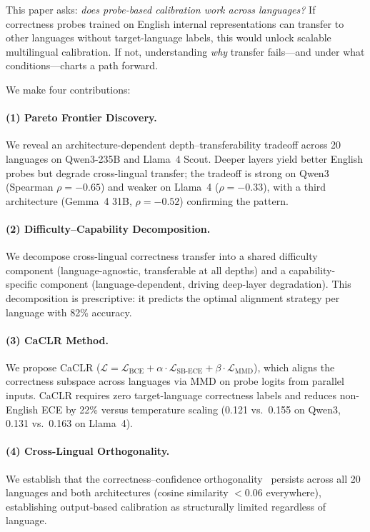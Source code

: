 \documentclass[11pt,a4paper]{article}
\begin{document}
This paper asks: \emph{does probe-based calibration work across languages?}
If correctness probes trained on English internal representations can transfer to other languages without target-language labels, this would unlock scalable multilingual calibration.
If not, understanding \emph{why} transfer fails---and under what conditions---charts a path forward.

We make four contributions:

\paragraph{(1) Pareto Frontier Discovery.}
We reveal an architecture-dependent depth--transferability tradeoff across 20 languages on Qwen3-235B and Llama~4 Scout.
Deeper layers yield better English probes but degrade cross-lingual transfer; the tradeoff is strong on Qwen3 (Spearman $\rho = -0.65$) and weaker on Llama~4 ($\rho = -0.33$), with a third architecture (Gemma~4 31B, $\rho = -0.52$) confirming the pattern.

\paragraph{(2) Difficulty--Capability Decomposition.}
We decompose cross-lingual correctness transfer into a shared difficulty component (language-agnostic, transferable at all depths) and a capability-specific component (language-dependent, driving deep-layer degradation).
This decomposition is prescriptive: it predicts the optimal alignment strategy per language with 82\% accuracy.

\paragraph{(3) CaCLR Method.}
We propose CaCLR ($\mathcal{L} = \mathcal{L}_{\text{BCE}} + \alpha \cdot \mathcal{L}_{\text{SB-ECE}} + \beta \cdot \mathcal{L}_{\text{MMD}}$), which aligns the correctness subspace across languages via MMD on probe logits from parallel inputs.
CaCLR requires zero target-language correctness labels and reduces non-English ECE by 22\% versus temperature scaling (0.121 vs.\ 0.155 on Qwen3, 0.131 vs.\ 0.163 on Llama~4).

\paragraph{(4) Cross-Lingual Orthogonality.}
We establish that the correctness--confidence orthogonality~\citep{miao2026correctness} persists across all 20 languages and both architectures (cosine similarity $<0.06$ everywhere), establishing output-based calibration as structurally limited regardless of language.
\end{document}
